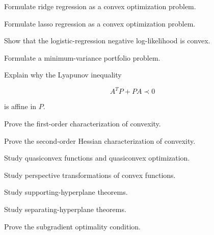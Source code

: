 \begin{exercise}[3]
Formulate ridge regression as a convex optimization problem.
\end{exercise}

\begin{exercise}[3]
Formulate lasso regression as a convex optimization problem.
\end{exercise}

\begin{exercise}[3]
Show that the logistic-regression negative log-likelihood is convex.
\end{exercise}

\begin{exercise}[3]
Formulate a minimum-variance portfolio problem.
\end{exercise}

\begin{exercise}[3]
Explain why the Lyapunov inequality

\[
A^TP+PA\prec0
\]

is affine in \(P\).
\end{exercise}

\begin{exercise}[4]
Prove the first-order characterization of convexity.
\end{exercise}

\begin{exercise}[4]
Prove the second-order Hessian characterization of convexity.
\end{exercise}

\begin{exercise}[4]
Study quasiconvex functions and quasiconvex optimization.
\end{exercise}

\begin{exercise}[4]
Study perspective transformations of convex functions.
\end{exercise}

\begin{exercise}[4]
Study supporting-hyperplane theorems.
\end{exercise}

\begin{exercise}[4]
Study separating-hyperplane theorems.
\end{exercise}

\begin{exercise}[4]
Prove the subgradient optimality condition.
\end{exercise}

